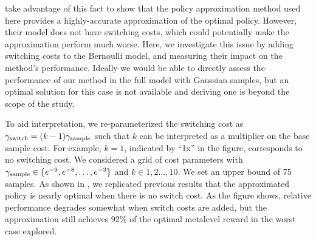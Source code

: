 \citet{callaway2018learning} take advantage of this fact to show that the policy approximation method used here provides a highly-accurate approximation of the optimal policy. However, their model does not have switching costs, which could potentially make the approximation perform much worse. Here, we investigate this issue by adding switching costs to the Bernoulli model, and measuring their impact on the method's performance. Ideally we would be able to directly assess the performance of our method in the full model with Gaussian samples, but an optimal solution for this case is not available and deriving one is beyond the scope of the study.


To aid interpretation, we re-parameterized the switching cost as $\gamma_\text{switch} = (k - 1)\gamma_\text{sample}$ such that $k$ can be interpreted as a multiplier on the base sample cost. For example, $k=1$, indicated by ``1x'' in the figure, corresponds to no switching cost. We considered a grid of cost parameters with $\gamma_\text{sample} \in \{e^{-9}, e^{-8}, \dots, e^{-3}\}$ and $k \in {1, 2 \dots, 10}$. We set an upper bound of 75 samples. As shown in , we replicated previous results that the approximated policy is nearly optimal when there is no switch cost. As the figure shows, relative performance degrades somewhat when switch costs are added, but the approximation still achieves 92\% of the optimal metalevel reward in the worst case explored.




